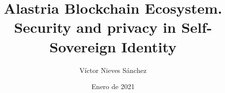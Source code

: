 \documentclass[a4paper, 12pt]{article} %
\author{Víctor Nieves Sánchez}
\date{Enero de 2021}
\title{Alastria Blockchain Ecosystem. Security and privacy in Self-Sovereign Identity}
\begin{document}
\maketitle
\null
\newpage

\begin{otherlanguage}{spanish}
    \renewcommand{\spanishabstractname}{Agradecimientos}
    \begin{abstract}
    \end{abstract}
\end{otherlanguage}

\newpage

\tableofcontents
\newpage

\listoffigures
\newpage
\listoftables
\newpage
\lstlistoflistings
\newpage
\printglossary[type=\acronymtype]
\newpage
\end{document}
